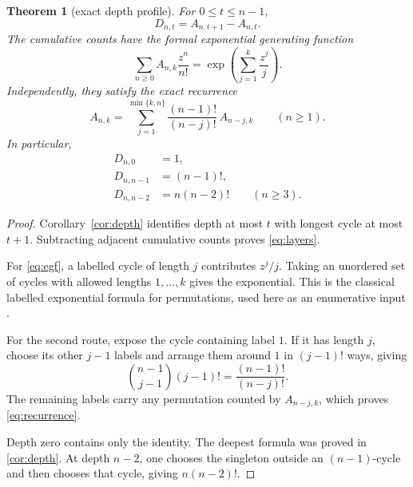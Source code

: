 \documentclass[11pt,a4paper]{amsart}
\newtheorem{theorem}{Theorem}[section]
\theoremstyle{definition}
\theoremstyle{remark}
\begin{document}
\begin{theorem}[exact depth profile]\label{thm:profile}
For $0\leq t\leq n-1$,
\begin{equation}\label{eq:layers}
 \boxed{D_{n,t}=A_{n,t+1}-A_{n,t}.}
\end{equation}
The cumulative counts have the formal exponential generating function
\begin{equation}\label{eq:egf}
 \boxed{
 \sum_{n\geq0}A_{n,k}\frac{z^n}{n!}
 =\exp\!\left(\sum_{j=1}^k\frac{z^j}{j}\right).}
\end{equation}
Independently, they satisfy the exact recurrence
\begin{equation}\label{eq:recurrence}
 A_{n,k}=\sum_{j=1}^{\min\{k,n\}}
 \frac{(n-1)!}{(n-j)!}\,A_{n-j,k}
 \qquad(n\geq1).
\end{equation}
In particular,
\begin{align}
 D_{n,0}&=1,\label{eq:first-layer}\\
 D_{n,n-1}&=(n-1)!,\label{eq:deepest}\\
 D_{n,n-2}&=n(n-2)!\qquad(n\geq3).\label{eq:penultimate}
\end{align}
\end{theorem}

\begin{proof}
Corollary~\ref{cor:depth} identifies depth at most $t$ with longest cycle at
most $t+1$.  Subtracting adjacent cumulative counts proves
\eqref{eq:layers}.

For \eqref{eq:egf}, a labelled cycle of length $j$ contributes $z^j/j$.
Taking an unordered set of cycles with allowed lengths
$1,\ldots,k$ gives the exponential.  This is the classical labelled
exponential formula for permutations, used here as an enumerative input
\cite{FlajoletSedgewick2009}.

For the second route, expose the cycle containing label $1$.  If it has
length $j$, choose its other $j-1$ labels and arrange them around $1$ in
$(j-1)!$ ways, giving
\[
 \binom{n-1}{j-1}(j-1)!=\frac{(n-1)!}{(n-j)!}.
\]
The remaining labels carry any permutation counted by $A_{n-j,k}$, which
proves \eqref{eq:recurrence}.

Depth zero contains only the identity.  The deepest formula was proved in
\cref{cor:depth}.  At depth $n-2$, one chooses the singleton outside an
$(n-1)$-cycle and then chooses that cycle, giving
$n(n-2)!$.
\end{proof}
\end{document}
